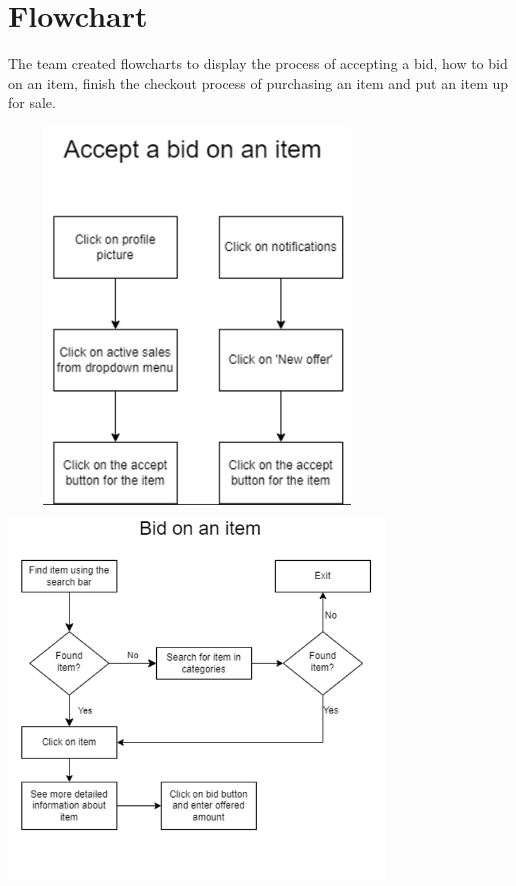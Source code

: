 \section{Flowchart}

The team created flowcharts to display the process of accepting a bid, how to bid on an item, finish the checkout process of purchasing an item and put an item up for sale. 
\begin{center}
\includegraphics[width=100mm, height=100mm]{Images/FlowChart/accept_a_bid_on_an_item.png}\\[1cm]
\includegraphics[width=100mm, height=100mm]{Images/FlowChart/Bid_on_an_item.png}

\end{center}
